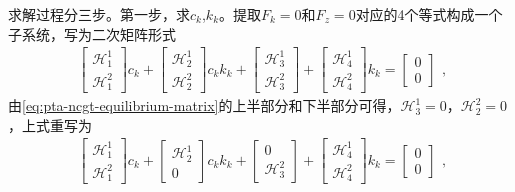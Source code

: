 求解过程分三步。第一步，求$c_k$,$k_k$。提取$F_k=0$和$F_z=0$对应的4个等式构成一个子系统，写为二次矩阵形式
\begin{equation*}
  \begin{split}
    \begin{bmatrix}
      \mathcal{H}_1^1 \\ \mathcal{H}_1^2
    \end{bmatrix}
    c_k
    + \begin{bmatrix}
    \mathcal{H}_2^1 \\ \mathcal{H}_2^2
    \end{bmatrix}
    c_k k_k
    + \begin{bmatrix}
    \mathcal{H}_3^1 \\ \mathcal{H}_3^2
    \end{bmatrix}
    + \begin{bmatrix}
    \mathcal{H}_4^1 \\ \mathcal{H}_4^2
    \end{bmatrix}
    k_k
    = \begin{bmatrix}
    0 \\ 0
    \end{bmatrix}
  \end{split},
\end{equation*}
由\eqref{eq:pta-ncgt-equilibrium-matrix}的上半部分和下半部分可得，$\mathcal{H}_3^1 = 0$，$\mathcal{H}_2^2 = 0$，上式重写为
\begin{equation}
  \label{eq:pta-ncgt-fk-unknown-partition}
  \begin{split}
    \begin{bmatrix}
      \mathcal{H}_1^1 \\ \mathcal{H}_1^2
    \end{bmatrix}
    c_k
    + \begin{bmatrix}
    \mathcal{H}_2^1 \\ 0
    \end{bmatrix}
    c_k k_k
    + \begin{bmatrix}
    0 \\ \mathcal{H}_3^2
    \end{bmatrix}
    + \begin{bmatrix}
    \mathcal{H}_4^1 \\ \mathcal{H}_4^2
    \end{bmatrix}
    k_k
    = \begin{bmatrix}
    0 \\ 0
    \end{bmatrix}
  \end{split},
\end{equation}

